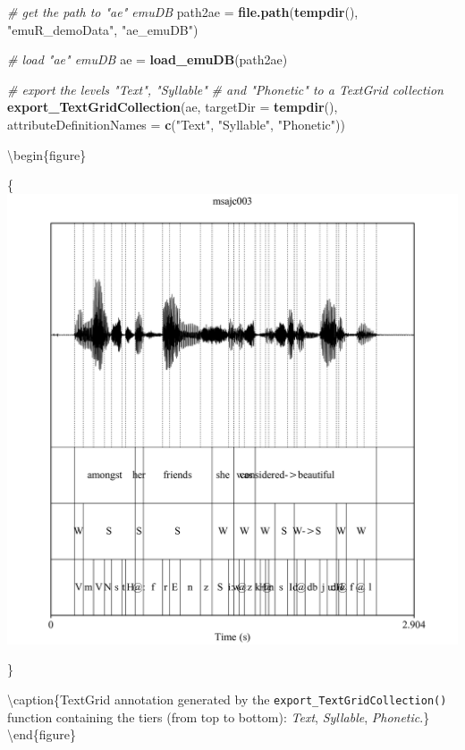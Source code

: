 \documentclass[]{book}
\newenvironment{Shaded}{\begin{snugshade}}{\end{snugshade}}
\newcommand{\CommentTok}[1]{\textcolor[rgb]{0.56,0.35,0.01}{\textit{#1}}}
\newcommand{\DataTypeTok}[1]{\textcolor[rgb]{0.13,0.29,0.53}{#1}}
\newcommand{\KeywordTok}[1]{\textcolor[rgb]{0.13,0.29,0.53}{\textbf{#1}}}
\newcommand{\NormalTok}[1]{#1}
\newcommand{\StringTok}[1]{\textcolor[rgb]{0.31,0.60,0.02}{#1}}
\theoremstyle{definition}
\theoremstyle{definition}
\theoremstyle{definition}
\theoremstyle{remark}
\begin{document}
\begin{Shaded}
\begin{Highlighting}[]
\CommentTok{# get the path to "ae" emuDB}
\NormalTok{path2ae =}\StringTok{ }\KeywordTok{file.path}\NormalTok{(}\KeywordTok{tempdir}\NormalTok{(), }\StringTok{"emuR_demoData"}\NormalTok{, }\StringTok{"ae_emuDB"}\NormalTok{)}

\CommentTok{# load "ae" emuDB}
\NormalTok{ae =}\StringTok{ }\KeywordTok{load_emuDB}\NormalTok{(path2ae)}

\CommentTok{# export the levels "Text", "Syllable"}
\CommentTok{# and "Phonetic" to a TextGrid collection}
\KeywordTok{export_TextGridCollection}\NormalTok{(ae,}
                          \DataTypeTok{targetDir =} \KeywordTok{tempdir}\NormalTok{(),}
                          \DataTypeTok{attributeDefinitionNames =} \KeywordTok{c}\NormalTok{(}\StringTok{"Text"}\NormalTok{,}
                                                       \StringTok{"Syllable"}\NormalTok{,}
                                                       \StringTok{"Phonetic"}\NormalTok{))}
\end{Highlighting}
\end{Shaded}

\textbackslash{}begin\{figure\}

\{\centering \includegraphics[width=0.75\linewidth]{pics/msajc003_fromExport}

\}

\textbackslash{}caption\{TextGrid annotation generated by the
\texttt{export\_TextGridCollection()} function containing the tiers
(from top to bottom): \emph{Text}, \emph{Syllable},
\emph{Phonetic}.\}\label{fig:emuRfuncs-msajc003-fromExport}
\textbackslash{}end\{figure\}
\end{document}
